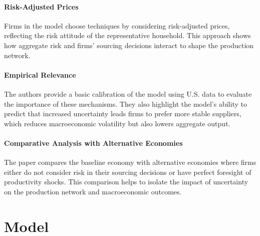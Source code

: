\documentclass[11pt]{article}
\theoremstyle{definition}
\begin{document}
	\paragraph{Risk-Adjusted Prices}
	Firms in the model choose techniques by considering risk-adjusted prices, reflecting the risk attitude of the representative household. This approach shows how aggregate risk and firms' sourcing decisions interact to shape the production network.
	
	\paragraph{Empirical Relevance}	
	The authors provide a basic calibration of the model using U.S. data to evaluate the importance of these mechanisms. They also highlight the model's ability to predict that increased uncertainty leads firms to prefer more stable suppliers, which reduces macroeconomic volatility but also lowers aggregate output.
	
	\paragraph{Comparative Analysis with Alternative Economies}
	The paper compares the baseline economy with alternative economies where firms either do not consider risk in their sourcing decisions or have perfect foresight of productivity shocks. This comparison helps to isolate the impact of uncertainty on the production network and macroeconomic outcomes.
	
	
	\section{Model}
\end{document}
